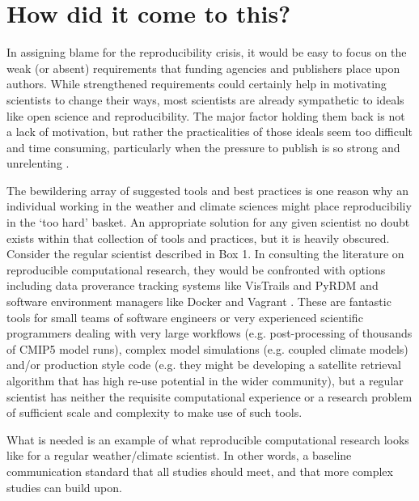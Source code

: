 \section{How did it come to this?}

In assigning blame for the reproducibility crisis, it would be easy to focus on the weak (or absent) requirements that funding agencies and publishers place upon authors. While strengthened requirements could certainly help in motivating scientists to change their ways, most scientists are already sympathetic to ideals like open science and reproducibility. The major factor holding them back is not a lack of motivation, but rather the practicalities of those ideals seem too difficult and time consuming, particularly when the pressure to publish is so strong and unrelenting \citep[e.g.][]{Stodden2010}. 

The bewildering array of suggested tools and best practices is one reason why an individual working in the weather and climate sciences might place reproducibiliy in the `too hard' basket. An appropriate solution for any given scientist no doubt exists within that collection of tools and practices, but it is heavily obscured. Consider the regular scientist described in Box 1. In consulting the literature on reproducible computational research, they would be confronted with options including data proverance tracking systems like VisTrails \citep{Freire2012} and PyRDM \citep{Jacobs2014} and software environment managers like Docker and Vagrant \citep{Stodden2014}. These are fantastic tools for small teams of software engineers or very experienced scientific programmers dealing with very large workflows (e.g. post-processing of thousands of CMIP5 model runs), complex model simulations (e.g. coupled climate models) and/or production style code (e.g. they might be developing a satellite retrieval algorithm that has high re-use potential in the wider community), but a regular scientist has neither the requisite computational experience or a research problem of sufficient scale and complexity to make use of such tools.

What is needed is an example of what reproducible computational research looks like for a regular weather/climate scientist. In other words, a baseline communication standard that all studies should meet, and that more complex studies can build upon.